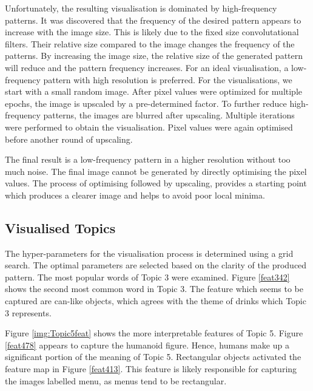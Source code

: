 \documentclass{article}
\begin{document}
Unfortunately, the resulting visualisation is dominated by high-frequency patterns. It was discovered that the frequency of the desired pattern appears to increase with the image size. This is likely due to the fixed size convolutational filters. Their relative size compared to the image changes the frequency of the patterns. By increasing the image size, the relative size of the generated pattern will reduce and the pattern frequency increases. For an ideal visualisation, a low-frequency pattern with high resolution is preferred. For the visualisations, we start with a small random image. After pixel values were optimized for multiple epochs, the image is upscaled by a pre-determined factor. To further reduce high-frequency patterns, the images are blurred after upscaling. Multiple iterations were performed to obtain the visualisation. Pixel values were again optimised before another round of upscaling. 

The final result is a low-frequency pattern in a higher resolution without too much noise. The final image cannot be generated by directly optimising the pixel values. The process of optimising followed by upscaling, provides a starting point which produces a clearer image and helps to avoid poor local minima. 

\subsection{Visualised Topics}
The hyper-parameters for the visualisation process is determined using a grid search. The optimal parameters are selected based on the clarity of the produced pattern. The most popular words of Topic 3 were examined. Figure \ref{feat342} shows the second most common word in Topic 3. The feature which seems to be captured are can-like objects, which agrees with the theme of drinks which Topic 3 represents.

Figure \ref{img:Topic5feat} shows the more interpretable features of Topic 5. Figure \ref{feat478} appears to capture the humanoid figure. Hence, humans make up a significant portion of the meaning of Topic 5. Rectangular objects activated the feature map in Figure \ref{feat413}. This feature is likely responsible for capturing the images labelled menu, as menus tend to be rectangular.
\end{document}

